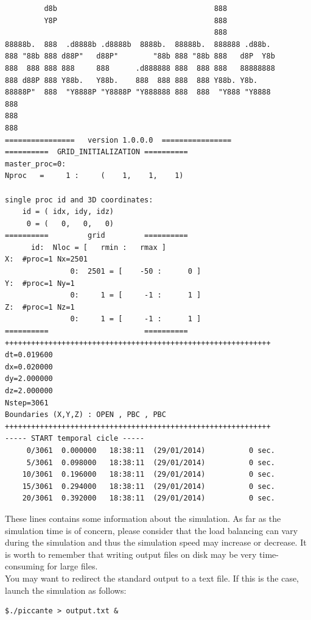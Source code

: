 \documentclass[11pt,a4paper]{report}
\begin{document}
\begin{verbatim}
         d8b                                    888                
         Y8P                                    888                
                                                888                
88888b.  888  .d8888b .d8888b  8888b.  88888b.  888888 .d88b.      
888 "88b 888 d88P"   d88P"        "88b 888 "88b 888   d8P  Y8b
888  888 888 888     888      .d888888 888  888 888   88888888     
888 d88P 888 Y88b.   Y88b.    888  888 888  888 Y88b. Y8b.         
88888P"  888  "Y8888P "Y8888P "Y888888 888  888  "Y888 "Y8888
888                                                                
888                                                                
888             
================   version 1.0.0.0  ================
==========  GRID_INITIALIZATION ==========
master_proc=0:
Nproc   =     1 :     (    1,    1,    1)

single proc id and 3D coordinates:
    id = ( idx, idy, idz)
     0 = (   0,   0,   0)
==========         grid         ==========
	  id:  Nloc = [   rmin :   rmax ]
X:  #proc=1	Nx=2501
               0:  2501 = [    -50 :      0 ]
Y:  #proc=1	Ny=1
               0:     1 = [     -1 :      1 ]
Z:  #proc=1	Nz=1
               0:     1 = [     -1 :      1 ]
==========                      ==========
+++++++++++++++++++++++++++++++++++++++++++++++++++++++++++++
dt=0.019600
dx=0.020000
dy=2.000000
dz=2.000000
Nstep=3061
Boundaries (X,Y,Z) : OPEN , PBC , PBC 
+++++++++++++++++++++++++++++++++++++++++++++++++++++++++++++
----- START temporal cicle -----
     0/3061  0.000000   18:38:11  (29/01/2014)          0 sec.
     5/3061  0.098000   18:38:11  (29/01/2014)          0 sec.
    10/3061  0.196000   18:38:11  (29/01/2014)          0 sec.
    15/3061  0.294000   18:38:11  (29/01/2014)          0 sec.
    20/3061  0.392000   18:38:11  (29/01/2014)          0 sec.
\end{verbatim}
These lines contains some information about the simulation. As far as the simulation time is of concern, please consider that the load balancing can vary during the simulation and thus the simulation speed may increase or decrease. It is worth to remember that writing output files on disk may be very time-consuming for large files.\\
You may want to redirect the standard output to a text file. If this is the case, launch the simulation as follows:
\begin{verbatim}
$./piccante > output.txt &
\end{verbatim}
\end{document}
